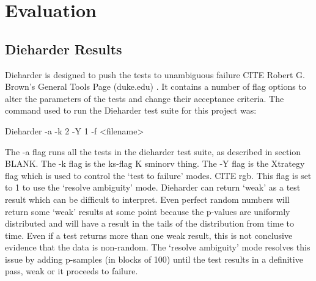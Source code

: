 \chapter{Evaluation}

\section{Dieharder Results}

Dieharder is designed to push the tests to unambiguous failure CITE Robert G. Brown's General Tools Page (duke.edu) . It contains a number of flag options to alter the parameters of the tests and change their acceptance criteria. The command used to run the Dieharder test suite for this project was:\newline

Dieharder -a -k 2 -Y 1 -f <filename>\newline

The -a flag runs all the tests in the dieharder test suite, as described in  section BLANK. The -k flag is the ks-flag K sminorv thing. The -Y flag is the Xtrategy flag which is used to control the ‘test to failure’ modes. CITE  rgb. This flag is set to 1 to use the ‘resolve ambiguity’ mode. Dieharder can return ‘weak’ as a test result which can be difficult to interpret. Even perfect random numbers will return some ‘weak’ results at some point because the p-values are uniformly distributed and will have a result in the tails of the distribution from time to time. Even if a test returns more than one weak result, this is not conclusive evidence that the data is non-random. The ‘resolve ambiguity’ mode resolves this issue by adding p-samples (in blocks of 100) until the test results in a definitive pass, weak or it proceeds to failure. \newline

